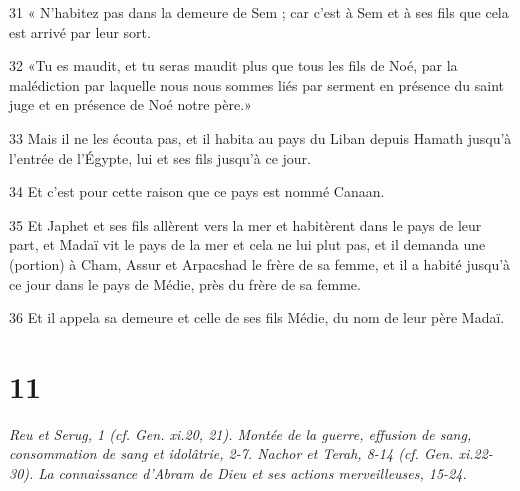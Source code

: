 \par 31 « N'habitez pas dans la demeure de Sem ; car c'est à Sem et à ses fils que cela est arrivé par leur sort.
\par 32 «Tu es maudit, et tu seras maudit plus que tous les fils de Noé, par la malédiction par laquelle nous nous sommes liés par serment en présence du saint juge et en présence de Noé notre père.»
\par 33 Mais il ne les écouta pas, et il habita au pays du Liban depuis Hamath jusqu'à l'entrée de l'Égypte, lui et ses fils jusqu'à ce jour.
\par 34 Et c'est pour cette raison que ce pays est nommé Canaan.
\par 35 Et Japhet et ses fils allèrent vers la mer et habitèrent dans le pays de leur part, et Madaï vit le pays de la mer et cela ne lui plut pas, et il demanda une (portion) à Cham, Assur et Arpacshad le frère de sa femme, et il a habité jusqu'à ce jour dans le pays de Médie, près du frère de sa femme.
\par 36 Et il appela sa demeure et celle de ses fils Médie, du nom de leur père Madaï.

\chapter{11}

\par \textit{Reu et Serug, 1 (cf. Gen. xi.20, 21). Montée de la guerre, effusion de sang, consommation de sang et idolâtrie, 2-7. Nachor et Terah, 8-14 (cf. Gen. xi.22-30). La connaissance d'Abram de Dieu et ses actions merveilleuses, 15-24.}

